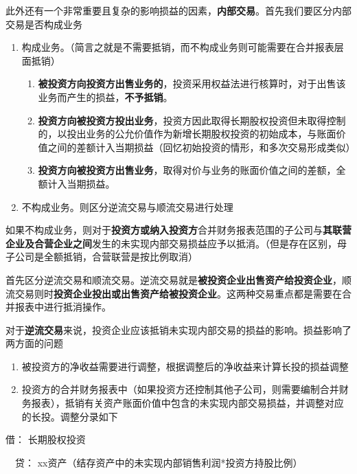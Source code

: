 \documentclass[UTF8,12pt]{ctexart}
\newenvironment{Dr}{\noindent 借：}{\par}
\newenvironment{Cr}{\noindent \ \ 贷：}{\par}
\numberwithin{equation}{section} %
\numberwithin{figure}{section}
\numberwithin{table}{section}
\begin{document}
	此外还有一个非常重要且复杂的影响损益的因素，\textbf{内部交易}。首先我们要区分内部交易是否构成业务
	\begin{enumerate}
		\item 构成业务。（简言之就是不需要抵销，而不构成业务则可能需要在合并报表层面抵销）
		\begin{enumerate}
			\item \textbf{被投资方向投资方出售业务的}，投资采用权益法进行核算时，对于出售该业务而产生的损益，\textbf{不予抵销}。
			
			\item \textbf{投资方向被投资方投出业务}，投资方因此取得长期股权投资但未取得控制的，以投出业务的公允价值作为新增长期股权投资的初始成本，与账面价值之间的差额计入当期损益（回忆初始投资的情形，和多次交易形成类似）
			
			\item \textbf{投资方向被投资方出售业务}，取得对价与业务的账面价值之间的差额，全额计入当期损益。
		\end{enumerate}
		
		\item 不构成业务。则区分逆流交易与顺流交易进行处理
	\end{enumerate}	
	
	如果不构成业务，则对于\textbf{投资方或纳入投资方}合并财务报表范围的子公司与\textbf{其联营企业及合营企业之间}发生的未实现内部交易损益应予以抵消。（但是存在区别，母子公司是全额抵销，合营联营是按比例取消）
	
	首先区分逆流交易和顺流交易。逆流交易就是\textbf{被投资企业出售资产给投资企业}，顺流交易则时\textbf{投资企业投出或出售资产给被投资企业}。这两种交易重点都是需要在合并报表中进行抵消操作。
	
	对于\textbf{逆流交易}来说，投资企业应该抵销未实现内部交易的损益的影响。损益影响了两方面的问题
	\begin{enumerate}
		\item 被投资方的净收益需要进行调整，根据调整后的净收益来计算长投的损益调整
		
		\item 投资方的合并财务报表中（如果投资方还控制其他子公司，则需要编制合并财务报表），抵销有关资产账面价值中包含的未实现内部交易损益，并调整对应的长投。调整分录如下
	\end{enumerate}
	
	\begin{Dr}
		长期股权投资
	\end{Dr}
	\begin{Cr}
		xx资产（结存资产中的未实现内部销售利润*投资方持股比例）
	\end{Cr}
	
\end{document}

